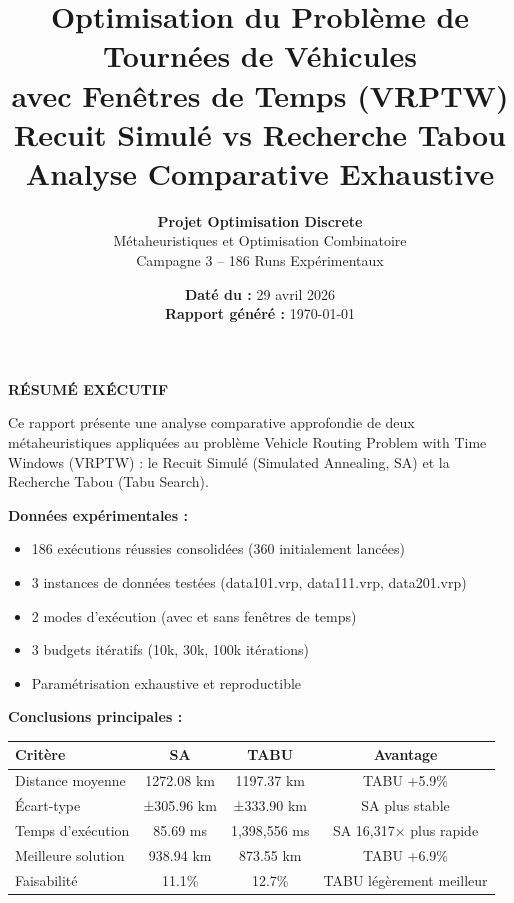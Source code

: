 \documentclass[12pt,a4paper,twoside]{report}
\title{
    \textbf{\huge Optimisation du Problème de Tournées de Véhicules} \\[0.5cm]
    \textbf{\Large avec Fenêtres de Temps (VRPTW)} \\[1.5cm]
    \large Recuit Simulé vs Recherche Tabou \\[0.3cm]
    \normalsize Analyse Comparative Exhaustive
}
\author{
    \textbf{Projet Optimisation Discrete} \\
    Métaheuristiques et Optimisation Combinatoire \\
    Campagne 3 -- 186 Runs Expérimentaux
}
\date{
    \textbf{Daté du :} 29 avril 2026 \\
    \textbf{Rapport généré :} \today
}
\begin{document}
\maketitle

\newpage
\thispagestyle{empty}
\vspace*{2cm}

\begin{center}
    \textbf{\Large RÉSUMÉ EXÉCUTIF} \\[1cm]
\end{center}

Ce rapport présente une analyse comparative approfondie de deux
métaheuristiques appliquées au problème Vehicle Routing Problem with Time
Windows (VRPTW) : le Recuit Simulé (Simulated Annealing, SA) et la Recherche
Tabou (Tabu Search).

\vspace{0.5cm}

\noindent\textbf{Données expérimentales :}
\begin{itemize}
    \item 186 exécutions réussies consolidées (360 initialement lancées)
    \item 3 instances de données testées (data101.vrp, data111.vrp, data201.vrp)
    \item 2 modes d'exécution (avec et sans fenêtres de temps)
    \item 3 budgets itératifs (10k, 30k, 100k itérations)
    \item Paramétrisation exhaustive et reproductible
\end{itemize}

\vspace{0.5cm}

\noindent\textbf{Conclusions principales :}

\begin{tabular}{|l|c|c|c|}
    \hline
    \textbf{Critère}   & \textbf{SA} & \textbf{TABU} & \textbf{Avantage}        \\
    \hline
    Distance moyenne   & 1272.08 km  & 1197.37 km    & TABU +5.9\%              \\
    Écart-type         & ±305.96 km  & ±333.90 km    & SA plus stable           \\
    Temps d'exécution  & 85.69 ms    & 1,398,556 ms  & SA 16,317× plus rapide   \\
    Meilleure solution & 938.94 km   & 873.55 km     & TABU +6.9\%              \\
    Faisabilité        & 11.1\%      & 12.7\%        & TABU légèrement meilleur \\
    \hline
\end{tabular}
\end{document}
